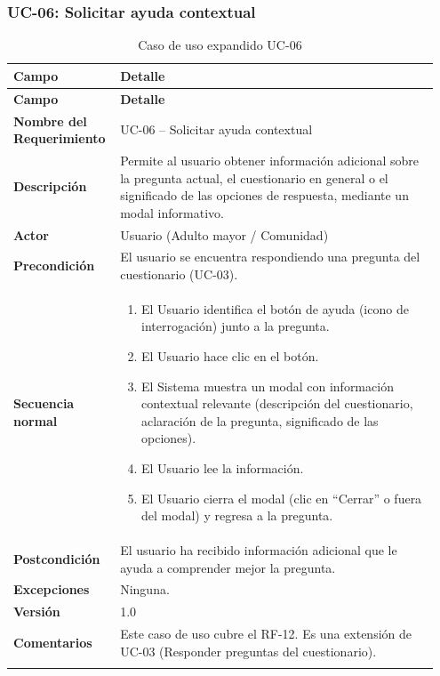 \subsubsection{UC-06: Solicitar ayuda contextual}

\begin{longtable}{p{0.22\linewidth} p{0.73\linewidth}}
\toprule
\rowcolor{tableheader!20}
\textbf{Campo} & \textbf{Detalle} \\
\midrule
\endfirsthead
\rowcolor{tableheader!20}
\textbf{Campo} & \textbf{Detalle} \\
\midrule
\endhead
\bottomrule
\endfoot
\textbf{Nombre del Requerimiento} & UC-06 -- Solicitar ayuda contextual \\
\textbf{Descripción} & Permite al usuario obtener información adicional sobre la pregunta actual, el cuestionario en general o el significado de las opciones de respuesta, mediante un modal informativo. \\
\textbf{Actor} & Usuario (Adulto mayor / Comunidad) \\
\textbf{Precondición} & El usuario se encuentra respondiendo una pregunta del cuestionario (UC-03). \\
\textbf{Secuencia normal} & 
  \begin{enumerate}
    \item El Usuario identifica el botón de ayuda (icono de interrogación) junto a la pregunta.
    \item El Usuario hace clic en el botón.
    \item El Sistema muestra un modal con información contextual relevante (descripción del cuestionario, aclaración de la pregunta, significado de las opciones).
    \item El Usuario lee la información.
    \item El Usuario cierra el modal (clic en ``Cerrar'' o fuera del modal) y regresa a la pregunta.
  \end{enumerate} \\
\textbf{Postcondición} & El usuario ha recibido información adicional que le ayuda a comprender mejor la pregunta. \\
\textbf{Excepciones} & Ninguna. \\
\textbf{Versión} & 1.0 \\
\textbf{Comentarios} & Este caso de uso cubre el RF-12. Es una extensión de UC-03 (Responder preguntas del cuestionario). \\
\bottomrule
\caption{Caso de uso expandido UC-06}
\label{tab:uc06}
\end{longtable}

